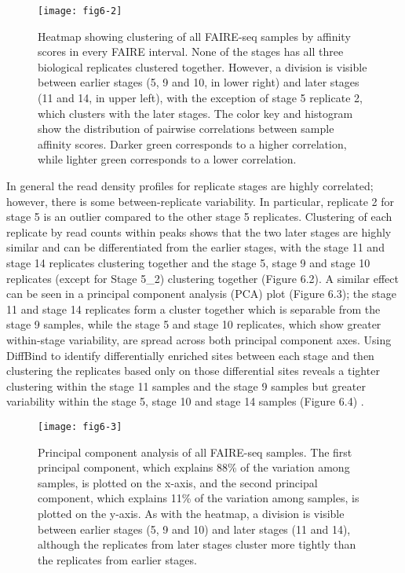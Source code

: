 \begin{figure}
\centering
\texttt{[image: fig6-2]}
\caption{Heatmap showing clustering of all FAIRE-seq samples by affinity scores in every FAIRE interval. None of the stages has all three biological replicates clustered together. However, a division is visible between earlier stages (5, 9 and 10, in lower right) and later stages (11 and 14, in upper left), with the exception of stage 5 replicate 2, which clusters with the later stages. The color key and histogram show the distribution of pairwise correlations between sample affinity scores. Darker green corresponds to a higher correlation, while lighter green corresponds to a lower correlation.}
\label{Figure 6.2}
\end{figure}

In general the read density profiles for replicate stages are highly correlated; however, there is some between-replicate variability. In particular, replicate 2 for stage 5 is an outlier compared to the other stage 5 replicates. Clustering of each replicate by read counts within peaks shows that the two later stages are highly similar and can be differentiated from the earlier stages, with the stage 11 and stage 14 replicates clustering together and the stage 5, stage 9 and stage 10 replicates (except for Stage 5\_2) clustering together (Figure 6.2). A similar effect can be seen in a principal component analysis (PCA) plot (Figure 6.3); the stage 11 and stage 14 replicates form a cluster together which is separable from the stage 9 samples, while the stage 5 and stage 10 replicates, which show greater within-stage variability, are spread across both principal component axes. Using DiffBind to identify differentially enriched sites between each stage and then clustering the replicates based only on those differential sites reveals a tighter clustering within the stage 11 samples and the stage 9 samples but greater variability within the stage 5, stage 10 and stage 14 samples (Figure 6.4) \citep{ross-innes_differential_2012}.\\

\begin{figure}
\centering
\texttt{[image: fig6-3]}
\caption{Principal component analysis of all FAIRE-seq samples. The first principal component, which explains 88\% of the variation among samples, is plotted on the x-axis, and the second principal component, which explains 11\% of the variation among samples, is plotted on the y-axis. As with the heatmap, a division is visible between earlier stages (5, 9 and 10) and later stages (11 and 14), although the replicates from later stages cluster more tightly than the replicates from earlier stages.}
\label{Figure 6.3}
\end{figure}

